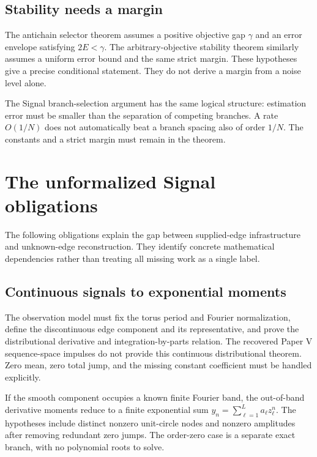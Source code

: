 \documentclass[11pt]{article}
\begin{document}
\hypertarget{stability-needs-a-margin}{%
\subsection{Stability needs a margin}\label{stability-needs-a-margin}}

The antichain selector theorem assumes a positive objective gap \(\gamma\) and an error envelope satisfying \(2E<\gamma\). The arbitrary-objective stability theorem similarly assumes a uniform error bound and the same strict margin. These hypotheses give a precise conditional statement. They do not derive a margin from a noise level alone.

The Signal branch-selection argument has the same logical structure: estimation error must be smaller than the separation of competing branches. A rate \(O(1/N)\) does not automatically beat a branch spacing also of order \(1/N\). The constants and a strict margin must remain in the theorem.

\hypertarget{the-unformalized-signal-obligations}{%
\section{The unformalized Signal obligations}\label{the-unformalized-signal-obligations}}

The following obligations explain the gap between supplied-edge infrastructure and unknown-edge reconstruction. They identify concrete mathematical dependencies rather than treating all missing work as a single label.

\hypertarget{continuous-signals-to-exponential-moments}{%
\subsection{Continuous signals to exponential moments}\label{continuous-signals-to-exponential-moments}}

The observation model must fix the torus period and Fourier normalization, define the discontinuous edge component and its representative, and prove the distributional derivative and integration-by-parts relation. The recovered Paper V sequence-space impulses do not provide this continuous distributional theorem. Zero mean, zero total jump, and the missing constant coefficient must be handled explicitly.

If the smooth component occupies a known finite Fourier band, the out-of-band derivative moments reduce to a finite exponential sum \(y_n=\sum_{\ell=1}^L a_\ell z_\ell^n\). The hypotheses include distinct nonzero unit-circle nodes and nonzero amplitudes after removing redundant zero jumps. The order-zero case is a separate exact branch, with no polynomial roots to solve.
\end{document}
